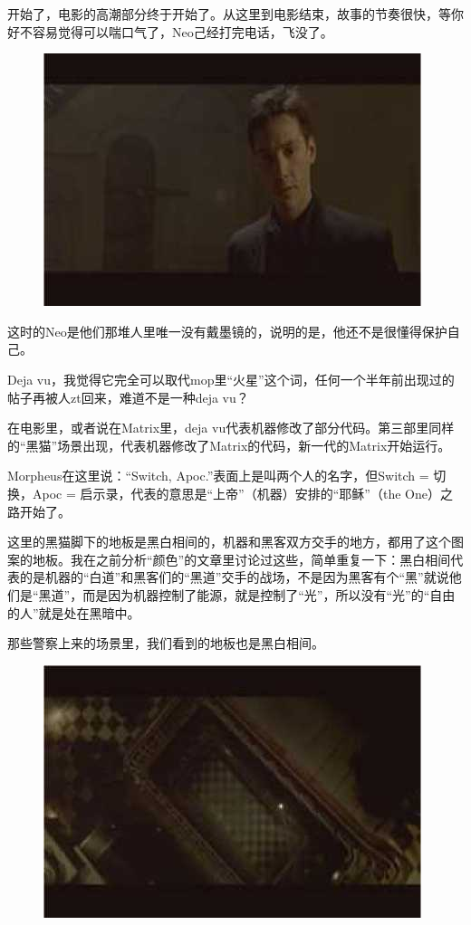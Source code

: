 \documentclass[UTF8]{ctexart}
\begin{document}
开始了，电影的高潮部分终于开始了。从这里到电影结束，故事的节奏很快，等你好不容易觉得可以喘口气了，Neo己经打完电话，飞没了。

\begin{figure}[htb]
\centering
\includegraphics[width=0.5\linewidth]{fig/read_Matrix-52}
\end{figure}

这时的Neo是他们那堆人里唯一没有戴墨镜的，说明的是，他还不是很懂得保护自己。

Deja vu，我觉得它完全可以取代mop里“火星”这个词，任何一个半年前出现过的帖子再被人zt回来，难道不是一种deja vu？

在电影里，或者说在Matrix里，deja vu代表机器修改了部分代码。第三部里同样的“黑猫”场景出现，代表机器修改了Matrix的代码，新一代的Matrix开始运行。

Morpheus在这里说：“Switch, Apoc.”表面上是叫两个人的名字，但Switch = 切换，Apoc = 启示录，代表的意思是“上帝”（机器）安排的“耶稣”（the One）之路开始了。

这里的黑猫脚下的地板是黑白相间的，机器和黑客双方交手的地方，都用了这个图案的地板。我在之前分析“颜色”的文章里讨论过这些，简单重复一下：黑白相间代表的是机器的“白道”和黑客们的“黑道”交手的战场，不是因为黑客有个“黑”就说他们是“黑道”，而是因为机器控制了能源，就是控制了“光”，所以没有“光”的“自由的人”就是处在黑暗中。

那些警察上来的场景里，我们看到的地板也是黑白相间。

\begin{figure}[htb]
\centering
\includegraphics[width=0.5\linewidth]{fig/read_Matrix-54}
\end{figure}
\end{document}
